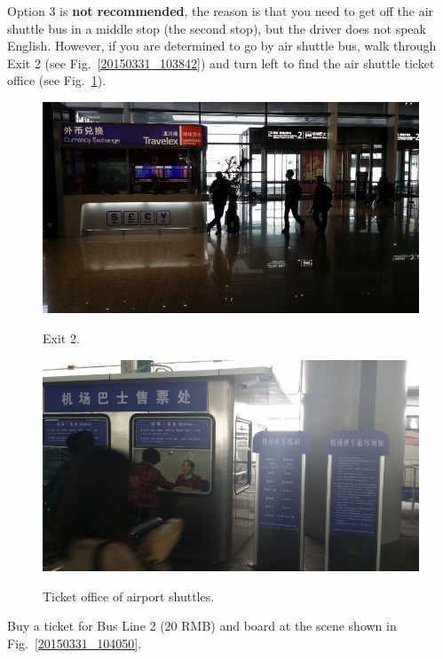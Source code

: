 \documentclass[11pt]{article}
\begin{document}
Option 3 is {\bf not recommended}, the reason is that you need to get off the air shuttle bus in a middle stop (the second stop), but the driver does not speak English. However, if you are determined to go by air shuttle bus, walk through Exit 2 (see Fig.~\ref{20150331_103842}) and turn left to find the air shuttle ticket office (see Fig.~\ref{20150331_105706}).
\begin{figure}[!h]
	\begin{minipage}[t]{.5\textwidth}
     	\centering
   	 	\includegraphics[scale=0.27]{20150331_103842.jpg}
    		\caption{Exit 2.\label{20150331_103842}}
	\end{minipage}%
     \begin{minipage}[t]{.5\textwidth}
         \centering
       	 \includegraphics[scale=0.27]{20150331_105706.jpg} \\
	 	\caption{Ticket office of airport shuttles.\label{20150331_105706}}
    \end{minipage}%
 \end{figure}
 Buy a ticket for Bus Line 2 (20 RMB) and board at the scene shown in Fig.~\ref{20150331_104050}.
\end{document}
